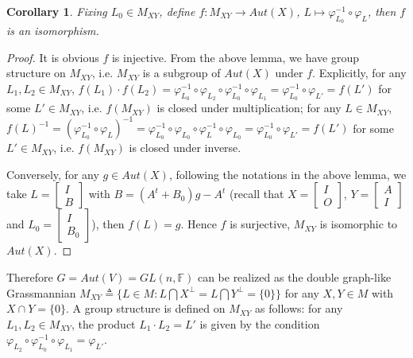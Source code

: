 \documentclass{article}
\newtheorem{cor}{Corollary}[section]
\begin{document}
\begin{cor}
Fixing $L_0 \in M_{XY}$, define $f: M_{XY} \rightarrow Aut(X)$, $L \mapsto \varphi_{L_0}^{-1}\circ \varphi_{L}$, then $f$ is an isomorphism.
\end{cor}
\begin{proof}
It is obvious $f$ is injective. From the above lemma, we have group structure on $M_{XY}$, i.e. $M_{XY}$ is a subgroup of $Aut(X)$ under $f$.
Explicitly, for any $L_1, L_2 \in M_{XY}$, $f(L_1)\cdot f(L_2)=\varphi_{L_0}^{-1}\circ \varphi_{L_2}\circ \varphi_{L_0}^{-1}\circ \varphi_{L_1}=\varphi_{L_0}^{-1}\circ \varphi_{L'}=f(L')$ for some $L' \in M_{XY}$,
i.e. $f(M_{XY})$ is closed under multiplication; for any $L \in M_{XY}$, $f(L)^{-1}=(\varphi_{L_0}^{-1}\circ \varphi_{L})^{-1}=\varphi_{L_0}^{-1}\circ \varphi_{L_0}\circ \varphi_{L}^{-1}\circ \varphi_{L_0}=\varphi_{L_0}^{-1}\circ \varphi_{L'}=f(L')$ for some $L' \in M_{XY}$, i.e. $f(M_{XY})$ is closed under inverse.



Conversely, for any $g \in Aut(X)$, following the notations in the above lemma, we take $L=\left[
\begin{array}{cc}
I \\
B \end{array} \right]$ with $B=(A^t+B_0)g-A^t$ (recall that $X=\left[
\begin{array}{cc}
I \\
O \end{array} \right]$, $Y=\left[
\begin{array}{cc}
A \\
I \end{array} \right]$ and $L_0=\left[
\begin{array}{cc}
I \\
B_0\end{array} \right]$), then $f(L)=g$. Hence $f$ is surjective, $M_{XY}$ is isomorphic to $Aut(X)$.
\end{proof}

Therefore $G=Aut(V)=GL(n, \mathbb{F})$ can be realized as the
double graph-like Grassmannian
$M_{XY} \triangleq \{L \in M: L \bigcap X^\bot=L \bigcap Y^\bot=\{0\}\}$
for any $X, Y \in M$ with $X \cap Y=\{0\}$. A group structure is defined on $M_{XY}$ as follows:
for any $L_1, L_2 \in M_{XY}$, the product $L_1 \cdot L_2=L'$ is given by the condition $ \varphi_{L_2}\circ \varphi_{L_0}^{-1}\circ \varphi_{L_1}=\varphi_{L'}$.
\end{document}
